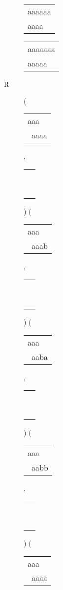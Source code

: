 \begin{description}
\begin{tabular}{|l|}
\hline
\end{tabular} 
\begin{tabular}{|l|} \hline
aaaaaa \\
aaaa\ \  \\
\hline
\end{tabular} 
\begin{tabular}{|l|} \hline
aaaaaaa \\
aaaaa\ \  \\
\hline
\end{tabular} 
\item[R] 
 ( 
\begin{tabular}{|l|} \hline
aaa\ \  \\
\ aaaa \\
\hline
\end{tabular} 
 , 
\begin{tabular}{|l|} \hline
\ \\ \ \\ \hline
\end{tabular} 
) 
 ( 
\begin{tabular}{|l|} \hline
aaa\ \  \\
\ aaab \\
\hline
\end{tabular} 
 , 
\begin{tabular}{|l|} \hline
\ \\ \ \\ \hline
\end{tabular} 
) 
 ( 
\begin{tabular}{|l|} \hline
aaa\ \  \\
\ aaba \\
\hline
\end{tabular} 
 , 
\begin{tabular}{|l|} \hline
\ \\ \ \\ \hline
\end{tabular} 
) 
 ( 
\begin{tabular}{|l|} \hline
aaa\ \  \\
\ aabb \\
\hline
\end{tabular} 
 , 
\begin{tabular}{|l|} \hline
\ \\ \ \\ \hline
\end{tabular} 
) 
 ( 
\begin{tabular}{|l|} \hline
aaa\ \  \\
\ aaaa \\
\hline

\end{tabular}
\end{description}
